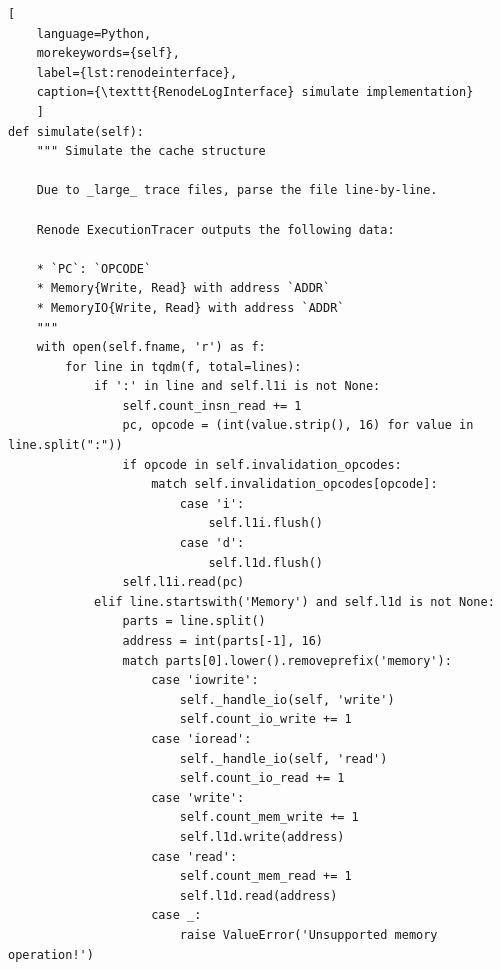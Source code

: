 \begin{center}
\centering
\begin{minipage}{\linewidth}
\begin{lstlisting}[
    language=Python,
	morekeywords={self},
    label={lst:renodeinterface},
    caption={\texttt{RenodeLogInterface} simulate implementation}
    ]
def simulate(self):
    """ Simulate the cache structure

    Due to _large_ trace files, parse the file line-by-line.

    Renode ExecutionTracer outputs the following data:

    * `PC`: `OPCODE`
    * Memory{Write, Read} with address `ADDR`
    * MemoryIO{Write, Read} with address `ADDR`
    """
    with open(self.fname, 'r') as f:
        for line in tqdm(f, total=lines):
            if ':' in line and self.l1i is not None:
                self.count_insn_read += 1
                pc, opcode = (int(value.strip(), 16) for value in line.split(":"))
                if opcode in self.invalidation_opcodes:
                    match self.invalidation_opcodes[opcode]:
                        case 'i':
                            self.l1i.flush()
                        case 'd':
                            self.l1d.flush()
                self.l1i.read(pc)
            elif line.startswith('Memory') and self.l1d is not None:
                parts = line.split()
                address = int(parts[-1], 16)
                match parts[0].lower().removeprefix('memory'):
                    case 'iowrite':
                        self._handle_io(self, 'write')
                        self.count_io_write += 1
                    case 'ioread':
                        self._handle_io(self, 'read')
                        self.count_io_read += 1
                    case 'write':
                        self.count_mem_write += 1
                        self.l1d.write(address)
                    case 'read':
                        self.count_mem_read += 1
                        self.l1d.read(address)
                    case _:
                        raise ValueError('Unsupported memory operation!')
\end{lstlisting}
\end{minipage}
\end{center}

